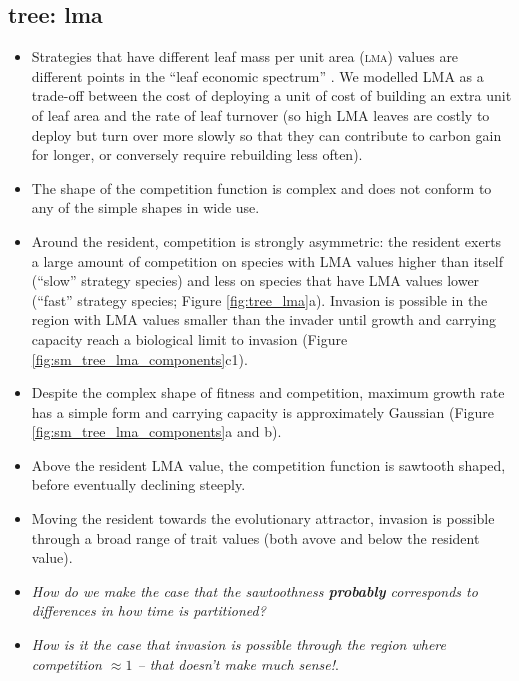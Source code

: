 \documentclass[a4paper,11pt]{article}
\newcommand{\TREE}{{\sc tree}}
\begin{document}
\subsection{\TREE: lma}
\begin{itemize}
\item Strategies that have different leaf mass per unit area
  (\textsc{lma}) values are different points in the ``leaf economic
  spectrum'' \citep{Reich-1997,Wright-2004}.  We modelled LMA as a
  trade-off between the cost of deploying a unit of cost of building
  an extra unit of leaf area and the rate of leaf turnover (so high
  LMA leaves are costly to deploy but turn over more slowly so that
  they can contribute to carbon gain for longer, or conversely require
  rebuilding less often).
\item The shape of the competition function is complex and does not
  conform to any of the simple shapes in wide use.
\item Around the resident, competition is strongly asymmetric: the
  resident exerts a large amount of competition on species with LMA
  values higher than itself (``slow'' strategy species) and less on
  species that have LMA values lower (``fast'' strategy species;
  Figure \ref{fig:tree_lma}a).  Invasion is possible in the region
  with LMA values smaller than the invader until growth and carrying
  capacity reach a biological limit to invasion (Figure
  \ref{fig:sm_tree_lma_components}c1).
\item Despite the complex shape of fitness and competition, maximum
  growth rate has a simple form and carrying capacity is approximately
  Gaussian (Figure \ref{fig:sm_tree_lma_components}a and b).
\item Above the resident LMA value, the competition function is
  sawtooth shaped, before eventually declining steeply.
\item Moving the resident towards the evolutionary attractor, invasion
  is possible through a broad range of trait values (both avove and
  below the resident value).
\item \textit{How do we make the case that the sawtoothness
    \textbf{probably} corresponds to differences in how time is
    partitioned?}
\item \textit{How is it the case that invasion is possible through the
    region where competition $\approx 1$ -- that doesn't make much
    sense!}.
\end{itemize}
\end{document}
